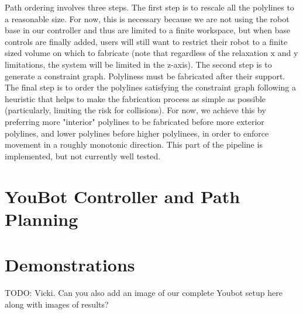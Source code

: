 \documentclass[conference]{acmsiggraph}
\begin{document}
Path ordering involves three steps.  The first step is to rescale all the polylines to a reasonable size.  For now, this is necessary because we are not using the robot base in our controller and thus are limited to a finite workspace, but when base controls are finally added, users will still want to restrict their robot to a finite sized volume on which to fabricate (note that regardless of the relaxation x and y limitations, the system will be limited in the z-axis).  The second step is to generate a constraint graph.  Polyliness must be fabricated after their support.  The final step is to order the polylines satisfying the constraint graph following a heuristic that helps to make the fabrication process as simple as possible (particularly, limiting the risk for collisions).  For now, we achieve this by preferring more "interior" polylines to be fabricated before more exterior polylines, and lower polylines before higher polylinees, in order to enforce movement in a roughly monotonic direction.  This part of the pipeline is implemented, but not currently well tested.

\section{YouBot Controller and Path Planning}

\section{Demonstrations}
TODO: Vicki.  Can you also add an image of our complete Youbot setup here along with images of results?






\end{document}
